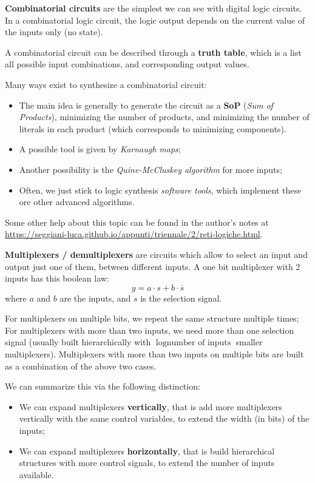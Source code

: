 \documentclass[a4paper,11pt]{article}
\begin{document}
\textbf{Combinatorial circuits} are the simplest we can see with digital logic circuits.
In a combinatorial logic circuit, the logic output depends on the current value of the inputs only (no state).

A combinatorial circuit can be described through a \textbf{truth table}, which is a list all possible input combinations, and corresponding output values.

Many ways exist to synthesize a combinatorial circuit:
\begin{itemize}
	\item The main idea is generally to generate the circuit as a \textbf{SoP} (\textit{Sum of Products}), minimizing the number of products, and minimizing the number of literals in each product (which corresponds to minimizing components).
	\item A possible tool is given by \textit{Karnaugh maps};
	\item Another possibility is the \textit{Quine-McCluskey algorithm} for more inputs;
	\item Often, we just stick to logic synthesis \textit{software tools}, which implement these ore other advanced algorithms.
\end{itemize}

Some other help about this topic can be found in the author's notes at \url{https://seggiani-luca.github.io/appunti/triennale/2/reti-logiche.html}.

\textbf{\textsf{Multiplexers / demultiplexers}} are circuits which allow to select an input and output just one of them, between different inputs.
A one bit multiplexer with 2 inputs has this boolean law:
$$
	y = a \cdot s + b \cdot \overline{s}
$$
where $a$ and $b$ are the inputs, and $s$ is the selection signal.

For multiplexers on multiple bits, we repeat the same structure multiple times;
For multiplexers with more than two inputs, we need more than one selection signal (usually built hierarchically with $\log{\text{number of inputs}}$ smaller multiplexers).
Multiplexers with more than two inputs on multiple bits are built as a combination of the above two cases.

We can summarize this via the following distinction:
\begin{itemize}
	\item We can expand multiplexers \textbf{vertically}, that is add more multiplexers vertically with the same control variables, to extend the width (in bits) of the inputs;
	\item We can expand multiplexers \textbf{horizontally}, that is build hierarchical structures with more control signals, to extend the number of inputs available.
\end{itemize}
\end{document}
